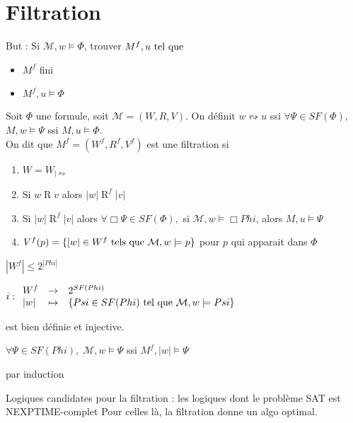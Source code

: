 \documentclass[10pt,a4paper]{article}
\newcommand{\M}{\mathcal{M}}
\DeclareMathOperator{\Ro}{R}
\begin{document}
\section{Filtration} 
But : Si $\M, w \models \Phi$, trouver $M^f, u \text{ tel que } $
\begin{itemize}
 \item $M^f$ fini
 \item $M^f, u \models \Phi$
\end{itemize}

\begin{definition}
 Soit $\Phi$ une formule, soit $\M = (W, R, V)$. On définit $w \leftrightsquigarrow u$ ssi $\forall \Psi \in SF(\Phi),$
$M, w \models \Psi$ ssi $M, u \models \Phi$.\\
On dit que $M^f = (W^f, R^f, V^f)$ est une filtration si 
\begin{enumerate}
 \item $W = W_{ |  \leftrightsquigarrow}$
 \item Si $w   \Ro v$ alors $ | w |    \Ro^f  | v | $
 \item Si $ | w |    \Ro^f  | v | $ alors $\forall \Box \Psi \in SF(\Phi), $
	si $\M, w \models \Box Phi$, alors $M,u \models \Psi$
\item $V^f(p) = \{ [ w  |  \in W^f \tq[s] \M,w \models p \}$ pour $p$ qui apparait dans $\Phi$
\end{enumerate}

\end{definition}

\begin{prop}
$ | W^f |  \leq 2^{ | Phi | }$
\end{prop}
\begin{dem}$
i:
\begin{array}{lcl}
 W^f & \rightarrow & 2^{SF(Phi)}\\
  | w |  & \mapsto&  \{ Psi \in SF(Phi) \tq \M, w \models Psi \}
\end{array}$

est bien définie et injective.
\end{dem}

\begin{thm}
 $\forall \Psi \in SF(Phi),\; \M,w \models \Psi$ ssi $M^f ,  | w |  \models \Psi$
\end{thm}
\begin{dem}
 par induction
\end{dem}

Logiques candidates pour la filtration : 
les logiques dont le problème SAT est NEXPTIME-complet
Pour celles là, la filtration donne un algo optimal.
 
\end{document}
